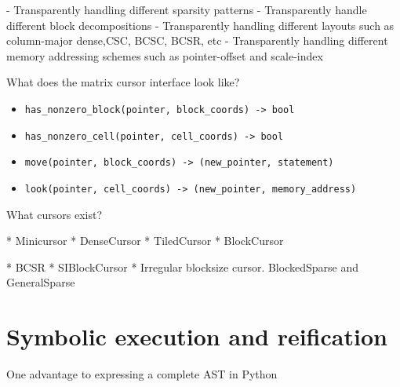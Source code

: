     - Transparently handling different sparsity patterns
        - Transparently handle different block decompositions
        - Transparently handling different layouts such as column-major dense,CSC, BCSC, BCSR, etc
        - Transparently handling different memory addressing schemes such as pointer-offset and scale-index


    What does the matrix cursor interface look like?

    \begin{itemize}
    \item \verb|has_nonzero_block(pointer, block_coords) -> bool|
    \item \verb|has_nonzero_cell(pointer, cell_coords) -> bool|
    \item \verb|move(pointer, block_coords) -> (new_pointer, statement)|
    \item \verb|look(pointer, cell_coords) -> (new_pointer, memory_address)|
    \end{itemize}


    What cursors exist?

    * Minicursor
    * DenseCursor
    * TiledCursor
    * BlockCursor
    
    * BCSR
    * SIBlockCursor
    * Irregular blocksize cursor. BlockedSparse and GeneralSparse

\section{Symbolic execution and reification}

One advantage to expressing a complete AST in Python
